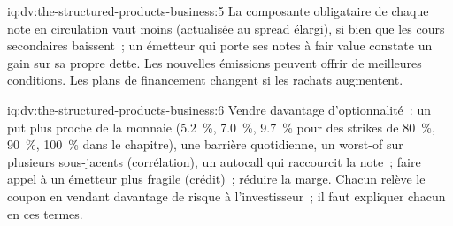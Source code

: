 \begin{solution}{iq:dv:the-structured-products-business:5}
La composante obligataire de chaque note en circulation vaut moins (actualisée au spread élargi), si bien que les cours secondaires baissent~; un émetteur qui porte ses notes à
fair value constate un gain sur sa propre dette. Les nouvelles émissions peuvent offrir de meilleures conditions. Les plans de financement changent si les rachats augmentent.
\end{solution}

\begin{solution}{iq:dv:the-structured-products-business:6}
Vendre davantage d'optionnalité~: un put plus proche de la monnaie (5.2~\%, 7.0~\%, 9.7~\% pour des strikes de 80~\%, 90~\%, 100~\% dans le chapitre), une barrière quotidienne, un worst-of sur
plusieurs sous-jacents (corrélation), un autocall qui raccourcit la note~; faire appel à un émetteur plus fragile (crédit)~; réduire la marge. Chacun relève le coupon en vendant
davantage de risque à l'investisseur~; il faut expliquer chacun en ces termes.
\end{solution}
